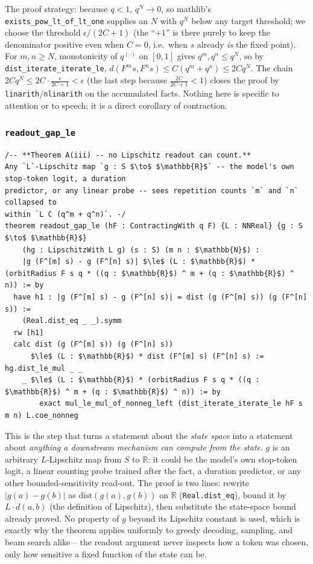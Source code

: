 \documentclass[11pt]{article}
\begin{document}
The proof strategy: because $q<1$, $q^N \to 0$, so mathlib's
\texttt{exists\_pow\_lt\_of\_lt\_one} supplies an $N$ with $q^N$ below any
target threshold; we choose the threshold $\epsilon/(2C+1)$ (the ``$+1$'' is
there purely to keep the denominator positive even when $C=0$, i.e.\ when $s$
already \emph{is} the fixed point). For $m,n\ge N$, monotonicity of $q^{(\cdot)}$
on $[0,1]$ gives $q^m,q^n \le q^N$, so by
\texttt{dist\_iterate\_iterate\_le}, $d(F^m s,F^n s) \le C(q^m+q^n) \le 2Cq^N$.
The chain $2Cq^N \le 2C\cdot\frac{\epsilon}{2C+1} < \epsilon$ (the last step
because $\frac{2C}{2C+1}<1$) closes the proof by \texttt{linarith}/\texttt{nlinarith}
on the accumulated facts. Nothing here is specific to attention or to
speech; it is a direct corollary of contraction.

\subsubsection*{\texttt{readout\_gap\_le}}

\begin{lstlisting}
/-- **Theorem A(iii) -- no Lipschitz readout can count.**
Any `L`-Lipschitz map `g : S $\to$ $\mathbb{R}$` -- the model's own stop-token logit, a duration
predictor, or any linear probe -- sees repetition counts `m` and `n` collapsed to
within `L C (q^m + q^n)`. -/
theorem readout_gap_le (hF : ContractingWith q F) {L : NNReal} {g : S $\to$ $\mathbb{R}$}
    (hg : LipschitzWith L g) (s : S) (m n : $\mathbb{N}$) :
    |g (F^[m] s) - g (F^[n] s)| $\le$ (L : $\mathbb{R}$) * (orbitRadius F s q * ((q : $\mathbb{R}$) ^ m + (q : $\mathbb{R}$) ^ n)) := by
  have h1 : |g (F^[m] s) - g (F^[n] s)| = dist (g (F^[m] s)) (g (F^[n] s)) :=
    (Real.dist_eq _ _).symm
  rw [h1]
  calc dist (g (F^[m] s)) (g (F^[n] s))
      $\le$ (L : $\mathbb{R}$) * dist (F^[m] s) (F^[n] s) := hg.dist_le_mul _ _
    _ $\le$ (L : $\mathbb{R}$) * (orbitRadius F s q * ((q : $\mathbb{R}$) ^ m + (q : $\mathbb{R}$) ^ n)) := by
        exact mul_le_mul_of_nonneg_left (dist_iterate_iterate_le hF s m n) L.coe_nonneg
\end{lstlisting}

This is the step that turns a statement about the \emph{state space} into a
statement about \emph{anything a downstream mechanism can compute from the
state}. $g$ is an arbitrary $L$-Lipschitz map from $S$ to $\mathbb{R}$: it
could be the model's own stop-token logit, a linear counting probe trained
after the fact, a duration predictor, or any other bounded-sensitivity
read-out. The proof is two lines: rewrite $|g(a)-g(b)|$ as
$\mathrm{dist}(g(a),g(b))$ on $\mathbb{R}$ (\texttt{Real.dist\_eq}), bound it
by $L\cdot d(a,b)$ (the definition of Lipschitz), then substitute the state-space
bound already proved. No property of $g$ beyond its Lipschitz constant is
used, which is exactly why the theorem applies uniformly to greedy decoding,
sampling, and beam search alike -- the readout argument never inspects how a
token was chosen, only how sensitive a fixed function of the state can be.
\end{document}
